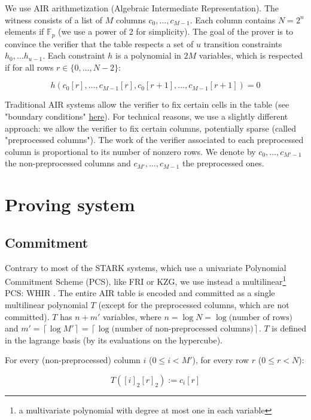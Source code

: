 \documentclass{article}
\newcommand{\Fp}{\mathbb F_p}
\newcommand{\Pol}{T}
\begin{document}
We use AIR arithmetization (Algebraic Intermediate Representation). The witness consists of a list of $M$ columns $c_0, \dots, c_{M-1}$. Each column contains $N = 2^n$ elements if $\Fp$ (we use a power of 2 for simplicity). The goal of the prover is to convince the verifier that the table respects a set of $u$ transition constraints $h_0, \dots h_{u-1}$. Each constraint $h$ is a polynomial in $2 M$ variables, which is respected if for all rows $r \in \{0, \dots, N-2\}$: 

$$h(c_0[r], \dots, c_{M-1}[r], c_0[r+1], \dots, c_{M-1}[r+1]) = 0$$

Traditional AIR systems allow the verifier to fix certain cells in the table (see "boundary conditions" \href{https://aszepieniec.github.io/stark-anatomy/stark}{here}). For technical reasons, we use a slightly different approach: we allow the verifier to fix certain columns, potentially sparse (called "preprocessed columns"). The work of the verifier associated to each preprocessed column is proportional to its number of nonzero rows. We denote by $c_0, \dots, c_{M'-1}$ the non-preprocessed columns and $c_{M'}, \dots, c_{M-1}$ the preprocessed ones.

\section{Proving system}

\subsection{Commitment}

Contrary to most of the STARK systems, which use a univariate Polynomial Commitment Scheme (PCS), like FRI or KZG, we use instead a multilinear\footnote{a multivariate polynomial with degree at most one in each variable} PCS: WHIR \cite{whir}. The entire AIR table is encoded and committed as a single multilinear polynomial $\Pol$ (except for the preprocessed columns, which are not committed). $\Pol$ has $n + m'$ variables, where $n = \log N = \log \text{(number of rows)}$ and $m' = \left\lceil  \log M' \right\rceil = \left\lceil  \log \text{(number of non-preprocessed columns)} \right\rceil$. $\Pol$ is defined in the lagrange basis (by its evaluations on the hypercube).

For every (non-preprocessed) column $i$ ($0 \leq i < M'$), for every row $r$ ($0 \leq r < N$): 

$$\Pol([i]_2 [r]_2) := c_{i}[r]$$
\end{document}
